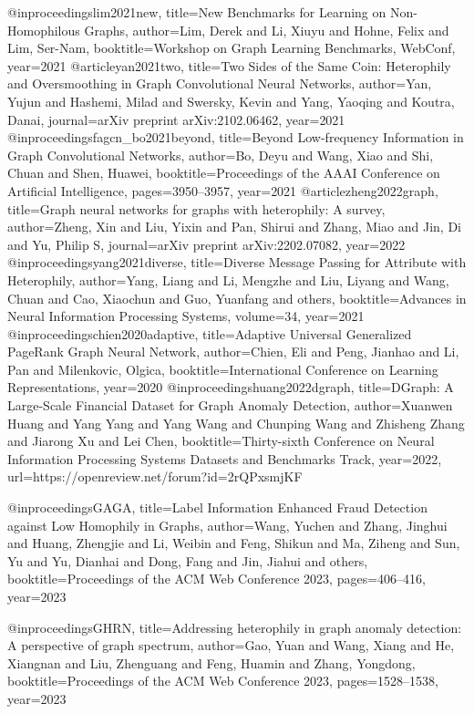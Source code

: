 @inproceedings{lim2021new,
  title={New Benchmarks for Learning on Non-Homophilous Graphs},
  author={Lim, Derek and Li, Xiuyu and Hohne, Felix and Lim, Ser-Nam},
  booktitle={Workshop on Graph Learning Benchmarks, WebConf},
  year={2021}
}
@article{yan2021two,
  title={Two Sides of the Same Coin: Heterophily and Oversmoothing in Graph Convolutional Neural Networks},
  author={Yan, Yujun and Hashemi, Milad and Swersky, Kevin and Yang, Yaoqing and Koutra, Danai},
  journal={arXiv preprint arXiv:2102.06462},
  year={2021}
}
@inproceedings{fagcn_bo2021beyond,
  title={Beyond Low-frequency Information in Graph Convolutional Networks},
  author={Bo, Deyu and Wang, Xiao and Shi, Chuan and Shen, Huawei},
  booktitle={Proceedings of the AAAI Conference on Artificial Intelligence},
  pages={3950--3957},
  year={2021}
}
@article{zheng2022graph,
  title={Graph neural networks for graphs with heterophily: A survey},
  author={Zheng, Xin and Liu, Yixin and Pan, Shirui and Zhang, Miao and Jin, Di and Yu, Philip S},
  journal={arXiv preprint arXiv:2202.07082},
  year={2022}
}
@inproceedings{yang2021diverse,
  title={Diverse Message Passing for Attribute with Heterophily},
  author={Yang, Liang and Li, Mengzhe and Liu, Liyang and Wang, Chuan and Cao, Xiaochun and Guo, Yuanfang and others},
  booktitle={Advances in Neural Information Processing Systems},
  volume={34},
  year={2021}
}
@inproceedings{chien2020adaptive,
  title={Adaptive Universal Generalized PageRank Graph Neural Network},
  author={Chien, Eli and Peng, Jianhao and Li, Pan and Milenkovic, Olgica},
  booktitle={International Conference on Learning Representations},
  year={2020}
}
@inproceedings{huang2022dgraph,
title={{DG}raph: A Large-Scale Financial Dataset for Graph Anomaly Detection},
author={Xuanwen Huang and Yang Yang and Yang Wang and Chunping Wang and Zhisheng Zhang and Jiarong Xu and Lei Chen},
booktitle={Thirty-sixth Conference on Neural Information Processing Systems Datasets and Benchmarks Track},
year={2022},
url={https://openreview.net/forum?id=2rQPxsmjKF}
}

@inproceedings{GAGA,
  title={Label Information Enhanced Fraud Detection against Low Homophily in Graphs},
  author={Wang, Yuchen and Zhang, Jinghui and Huang, Zhengjie and Li, Weibin and Feng, Shikun and Ma, Ziheng and Sun, Yu and Yu, Dianhai and Dong, Fang and Jin, Jiahui and others},
  booktitle={Proceedings of the ACM Web Conference 2023},
  pages={406--416},
  year={2023}
}

@inproceedings{GHRN,
  title={Addressing heterophily in graph anomaly detection: A perspective of graph spectrum},
  author={Gao, Yuan and Wang, Xiang and He, Xiangnan and Liu, Zhenguang and Feng, Huamin and Zhang, Yongdong},
  booktitle={Proceedings of the ACM Web Conference 2023},
  pages={1528--1538},
  year={2023}
}

